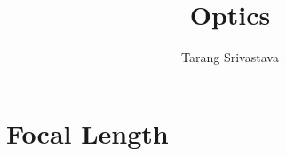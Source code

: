 \documentclass[11pt]{article}
\author{Tarang Srivastava}
\begin{document}
	\title{Optics}
	\maketitle
	\section{Focal Length}
		
\end{document}
